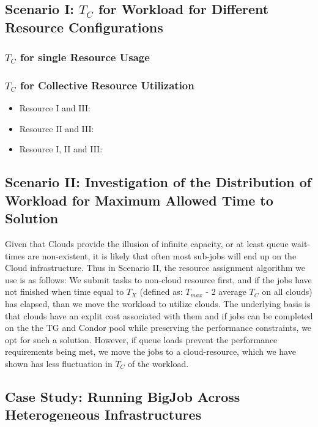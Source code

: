 \documentclass[conference,final]{IEEEtran}
\newcommand{\tmax}{$T_{max}$ }
\newcommand{\tc}{$T_{C}$ }
\begin{document}
\subsection{Scenario I: \tc for Workload for Different Resource Configurations}

\subsubsection{\tc for single Resource Usage}

\subsubsection{\tc for Collective Resource Utilization}

\begin{itemize}
\item Resource I and III:
\item Resource II and III:
\item Resource I, II and III:
\end{itemize}

\subsection{Scenario II: Investigation of the Distribution of Workload for Maximum Allowed
  Time to Solution} 

Given that Clouds provide the illusion of infinite capacity, or at
least queue wait-times are non-existent, it is likely that often most
sub-jobs will end up on the Cloud infrastructure.  Thus in Scenario
II, the resource assignment algorithm we use is as follows: We submit
tasks to non-cloud resource first, and if the jobs have not finished
when time equal to $T_{X}$ (defined as: \tmax - 2 average \tc on all
clouds) has elapsed, than we move the workload to utilize clouds.  The
underlying basis is that clouds have an explit cost associated with
them and if jobs can be completed on the the TG and Condor pool while
preserving the performance constraints, we opt for such a
solution. However, if queue loads prevent the performance requirements
being met, we move the jobs to a cloud-resource, which we have shown
has less fluctuation in \tc of the workload.

\subsection{Case Study: Running BigJob Across Heterogeneous Infrastructures}
\end{document}
